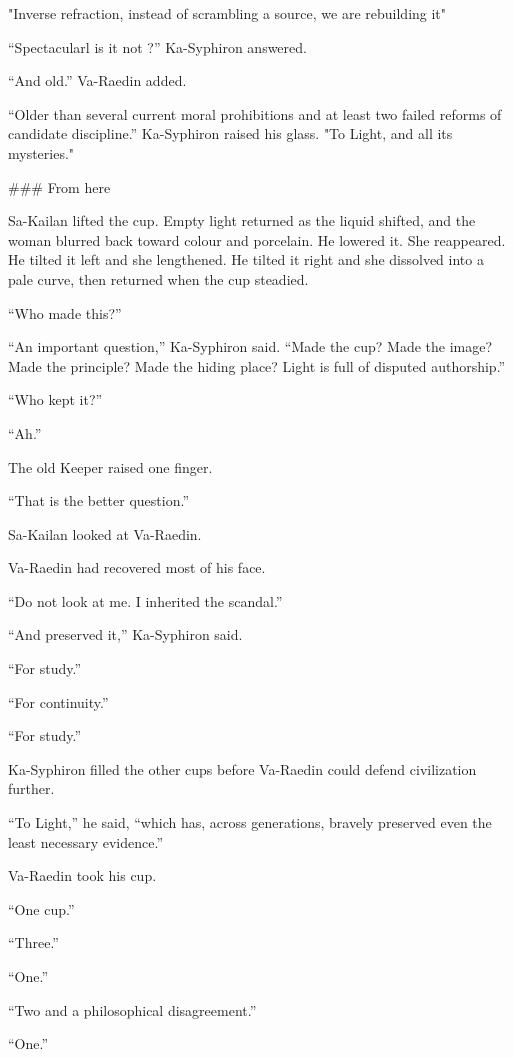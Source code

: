 "Inverse refraction, instead of scrambling a source, we are rebuilding it" \par
“Spectacularl is it not ?” Ka-Syphiron answered. \par
“And old.” Va-Raedin added. \par
“Older than several current moral prohibitions and at least two failed reforms of candidate discipline.” Ka-Syphiron raised his glass.
"To Light,  and all its mysteries." \par

### From here

Sa-Kailan lifted the cup. Empty light returned as the liquid shifted, and the woman blurred back toward colour and porcelain. He lowered it. She reappeared. He tilted it left and she lengthened. He tilted it right and she dissolved into a pale curve, then returned when the cup steadied.\par
“Who made this?”\par
“An important question,” Ka-Syphiron said. “Made the cup? Made the image? Made the principle? Made the hiding place? Light is full of disputed authorship.”\par
“Who kept it?”\par
“Ah.”\par
The old Keeper raised one finger.\par
“That is the better question.”\par
Sa-Kailan looked at Va-Raedin.\par
Va-Raedin had recovered most of his face.\par
“Do not look at me. I inherited the scandal.”\par
“And preserved it,” Ka-Syphiron said.\par
“For study.”\par
“For continuity.”\par
“For study.”\par
Ka-Syphiron filled the other cups before Va-Raedin could defend civilization further.\par
“To Light,” he said, “which has, across generations, bravely preserved even the least necessary evidence.”\par
Va-Raedin took his cup.\par
“One cup.”\par
“Three.”\par
“One.”\par
“Two and a philosophical disagreement.”\par
“One.”\par
